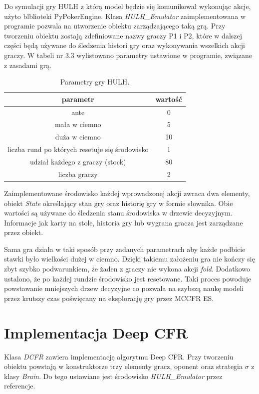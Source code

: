 \documentclass[12pt,oneside,a4paper]{report}
\begin{document}
Do symulacji gry HULH z którą model będzie się komunikował wykonując akcje, użyto blblioteki PyPokerEngine.
Klasa 
\emph{HULH\_Emulator} 
zaimplementowana w programie pozwala na utworzenie obiektu
zarządzającego taką grą. Przy tworzeniu obiektu zostają zdefiniowane 
nazwy graczy P1 i P2, które w dalszej części będą używane do śledzenia histori gry oraz wykonywania
wszelkich akcji graczy. 
W tabeli nr 3.3 wylistowano parametry ustawione w programie, związane z zasadami grą.


\begin{table}[h!]
\centering
\caption{Parametry gry HULH.}
\begin{tabular}{|c|c| }
   \hline
   parametr & wartość \\
    \hline
   ante & 0  \\ 
   \hline
   mała w ciemno & 5  \\  
   \hline
   duża w ciemno & 10 \\
   \hline
   liczba rund po których resetuje się środowisko & 1  \\
   \hline
   udział każdego z graczy (stock) & 80  \\
   \hline
   liczba graczy & 2 \\
   \hline
\end{tabular}
\end{table}



Zaimplementowane środowisko każdej wprowadzonej akcji zwraca dwa
elementy, obiekt \emph{State} określający stan gry oraz historię gry w formie słownika. 
Obie wartości są używane do
śledzenia stanu środowiska w drzewie decyzyjnym. Informacje jak karty na stole, historia gry lub 
wygrana gracza jest zarządzane przez obiekt.  

Sama gra działa w taki sposób przy zadanych parametrach aby każde podbicie stawki było wielkości
dużej w ciemno. Dzięki takiemu założeniu gra nie kończy się zbyt szybko 
podwarunkiem, że żaden z graczy nie wykona akcji \emph{fold}. Dodatkowo ustalono, że po każdej 
rundzie środowisko jest resetowane. Taki proces powoduje powstawanie mniejszych drzew
decyzyjne co pozwala na szybszą naukę modeli przez krutszy czas poświęcany na eksplorację gry przez
MCCFR ES. 


\section{Implementacja Deep CFR}

Klasa \emph{DCFR} zawiera implementację algorytmu Deep CFR. 
Przy tworzeniu obiektu powstają w
konstruktorze trzy elementy gracz, oponent oraz strategia $\sigma$ z klasy \emph{Brain}.
Do tego ustawiane jest środowisko \emph{HULH\_Emulator} przez referencje.
\end{document}
